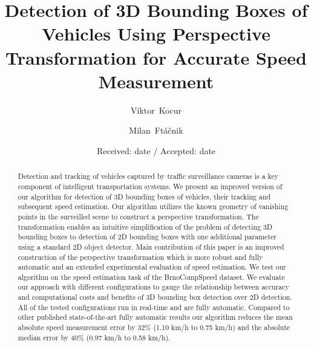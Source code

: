 \documentclass[twocolumn]{svjour3}          \smartqed  \usepackage{graphicx}
\begin{document}
\title{Detection of 3D Bounding Boxes of Vehicles Using Perspective Transformation for Accurate Speed Measurement}




\author{Viktor~Kocur         \and
        Milan~Ft\'{a}\v{c}nik }




\date{Received: date / Accepted: date}



\maketitle

\begin{abstract}
Detection and tracking of vehicles captured by traffic surveillance cameras is a key component of intelligent transportation systems. We present an improved version of our algorithm for detection of 3D bounding boxes of vehicles, their tracking and subsequent speed estimation. Our algorithm utilizes the known geometry of vanishing points in the surveilled scene to construct a perspective transformation. The transformation enables an intuitive simplification of the problem of detecting 3D bounding boxes to detection of 2D bounding boxes with one additional parameter using a standard 2D object detector. Main contribution of this paper is an improved construction of the perspective transformation which is more robust and fully automatic and an extended experimental evaluation of speed estimation. We test our algorithm on the speed estimation task of the BrnoCompSpeed dataset. We evaluate our approach with different configurations to gauge the relationship between accuracy and computational costs and benefits of 3D bounding box detection over 2D detection. All of the tested configurations run in real-time and are fully automatic. Compared to other published state-of-the-art fully automatic results our algorithm reduces the mean absolute speed measurement error by 32\% (1.10 km/h to 0.75 km/h) and the absolute median error by 40\% (0.97 km/h to 0.58 km/h).





\end{abstract}
\end{document}
